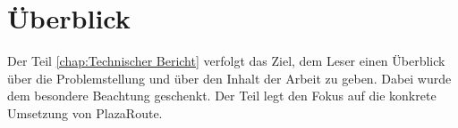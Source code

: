 \section{Überblick}
\label{sec:Überblick}
Der Teil \ref{chap:Technischer Bericht}  verfolgt das Ziel, dem Leser einen Überblick über die Problemstellung und über den Inhalt der Arbeit zu geben. Dabei wurde dem  besondere Beachtung geschenkt. Der Teil  legt den Fokus auf die konkrete Umsetzung von PlazaRoute.
